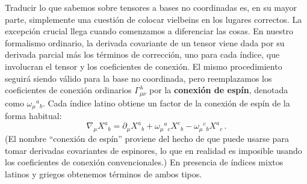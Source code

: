 \documentclass[11pt,b5paper,openany,twoside]{book}
\newcommand{\mn}{{\mu\nu}}
\begin{document}
Traducir lo que sabemos sobre tensores a bases no coordinadas es, en su mayor parte, simplemente una cuestión de colocar vielbeins en los lugares correctos.
La excepción crucial llega cuando comenzamos a diferenciar las cosas.
En nuestro formalismo ordinario, la derivada covariante de un tensor viene dada por su derivada parcial más los términos de corrección, uno para cada índice, que involucran el tensor y los coeficientes de conexión.
El mismo procedimiento seguirá siendo válido para la base no coordinada, pero reemplazamos los coeficientes de conexión ordinarios $\Gamma^\lambda_\mn$ por la {\bf conexión de espín}, denotada como $\omega_\mu{}^a{}_b$.
Cada índice latino obtiene un factor de la conexión de espín de la forma habitual:
\begin{equation}
\nabla_\mu X^a{}_b=\partial_\mu X^a{}_b+\omega_\mu{}^a{}_cX^c{}_b
-\omega_\mu{}^c{}_b X^a{}_c\,.\label{3.128}
\end{equation}
(El nombre ``conexión de espín'' proviene del hecho de que puede usarse para tomar derivadas covariantes de espinores, lo que en realidad es imposible usando los coeficientes de conexión convencionales.)
En presencia de índices mixtos latinos y griegos obtenemos términos de ambos tipos.
\end{document}
